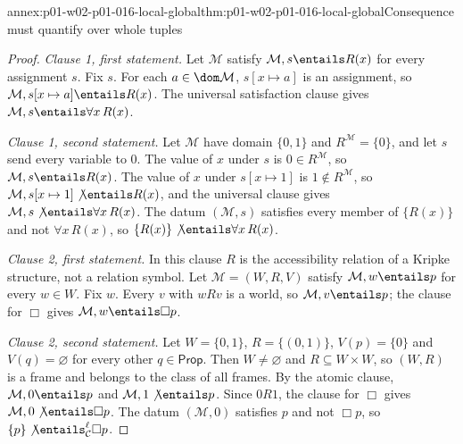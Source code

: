 \begin{annexitem}{annex:p01-w02-p01-016-local-global}{thm:p01-w02-p01-016-local-global}{Consequence must quantify over whole tuples}
\begin{proof}
\emph{Clause 1, first statement.} Let \(\mathcal M\) satisfy
\(\mathcal M,s\entails R(x)\) for every assignment \(s\). Fix \(s\). For each
\(a\in\dom\mathcal M\), \(s[x\mapsto a]\) is an assignment, so
\(\mathcal M,s[x\mapsto a]\entails R(x)\). The universal satisfaction clause
gives \(\mathcal M,s\entails\forall x\,R(x)\).

\emph{Clause 1, second statement.} Let \(\mathcal M\) have domain \(\{0,1\}\)
and \(R^{\mathcal M}=\{0\}\), and let \(s\) send every variable to \(0\). The
value of \(x\) under \(s\) is \(0\in R^{\mathcal M}\), so
\(\mathcal M,s\entails R(x)\). The value of \(x\) under \(s[x\mapsto1]\) is
\(1\notin R^{\mathcal M}\), so \(\mathcal M,s[x\mapsto1]\not\entails R(x)\),
and the universal clause gives \(\mathcal M,s\not\entails\forall x\,R(x)\).
The datum \((\mathcal M,s)\) satisfies every member of \(\{R(x)\}\) and not
\(\forall x\,R(x)\), so \(\{R(x)\}\not\entails\forall x\,R(x)\).

\emph{Clause 2, first statement.} In this clause \(R\) is the accessibility
relation of a Kripke structure, not a relation symbol. Let
\(\mathcal M=(W,R,V)\) satisfy \(\mathcal M,w\entails p\) for every
\(w\in W\). Fix \(w\). Every \(v\) with \(wRv\) is a world, so
\(\mathcal M,v\entails p\); the clause for \(\Box\) gives
\(\mathcal M,w\entails\Box p\).

\emph{Clause 2, second statement.} Let \(W=\{0,1\}\), \(R=\{(0,1)\}\),
\(V(p)=\{0\}\) and \(V(q)=\varnothing\) for every other \(q\in\mathsf{Prop}\).
Then \(W\ne\varnothing\) and \(R\subseteq W\times W\), so \((W,R)\) is a
frame and belongs to the class of all frames. By the atomic clause,
\(\mathcal M,0\entails p\) and \(\mathcal M,1\not\entails p\). Since \(0R1\),
the clause for \(\Box\) gives \(\mathcal M,0\not\entails\Box p\). The datum
\((\mathcal M,0)\) satisfies \(p\) and not \(\Box p\), so
\(\{p\}\not\entails^{\ell}_{\mathcal C}\Box p\).
\end{proof}
\end{annexitem}

